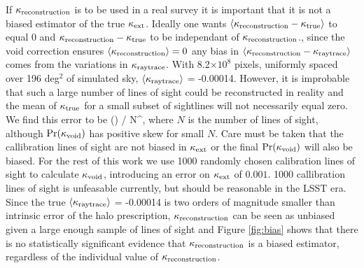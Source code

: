 \documentclass[useAMS,usenatbib]{mn2e}
\begin{document}
If $\kappa_{\rm reconstruction}$ is to be used in a real survey it is important that it is not a biased estimator of the true $\kappa_{\rm ext}$. 
Ideally one wants $\langle \kappa_{\rm reconstruction}-\kappa_{\rm true} \rangle$ to equal 0 and $\kappa_{\rm reconstruction}-\kappa_{\rm true}$ to be independant of
$\kappa_{\rm reconstruction}$., since the void correction ensures $\langle \kappa_{\rm reconstruction} \rangle = 0$ any bias in $\langle \kappa_{\rm reconstruction}-\kappa_{\rm raytrace} \rangle$ comes
from the variations in $\kappa_{\rm raytrace}$. With 8.2$\times 10^8$ pixels, uniformly spaced over 196 deg$^2$ of simulated sky,
 $\langle \kappa_{\rm raytrace} \rangle$ = -0.00014. However, it is improbable that such a large number of lines of sight
 could be reconstructed in reality and the mean of $\kappa_{\rm true}$ for a small subset of sightlines will not necessarily
equal zero. We find this error to be
\be\label{eq:sigmav}
\sigma(\kappav)  / N^{},
\ee
 where $N$ is the number of lines of sight, although ${\rm Pr}(\kappa_{\rm void})$ has positive skew for small $N$.
 Care must be taken that the callibration lines of sight are not biased in $\kappa_{\rm ext}$ or the final ${\rm Pr}(\kappa_{\rm void})$ will also be biased. For the rest of this work we use 1000  randomly chosen calibration lines of sight to calculate $\kappa_{\rm void}$, introducing an error on $\kappa_{\rm ext}$ of $0.001$. 1000 callibration lines of sight is unfeasable currently, but should be reasonable in the LSST era. Since the true $\langle \kappa_{\rm raytrace} \rangle$ = -0.00014 is two orders of magnitude smaller than intrinsic error of the halo prescription, $\kappa_{\rm reconstruction}$ can be seen as unbiased given a large enough sample of lines of sight and Figure \ref{fig:bias} shows that there is no statistically significant evidence that $\kappa_{\rm reconstruction}$ is a biased estimator, regardless of the individual value of $\kappa_{\rm reconstruction}$.
\end{document}
